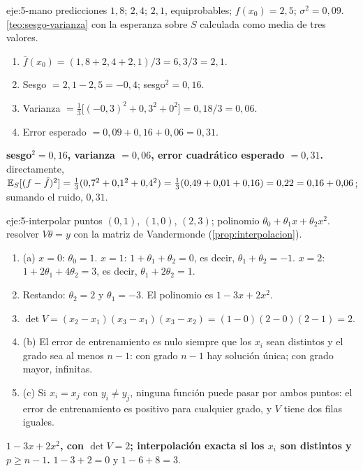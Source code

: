 \begin{solucion}{eje:5-mano}
\datos predicciones $1{,}8$; $2{,}4$; $2{,}1$, equiprobables; $f(x_0)=2{,}5$; $\sigma^{2}=0{,}09$.
\planteamiento \cref{teo:sesgo-varianza} con la esperanza sobre $S$ calculada como media de tres valores.
\pasos
\begin{enumerate}[label=\arabic*.]
  \item $\bar f(x_0)=(1{,}8+2{,}4+2{,}1)/3=6{,}3/3=2{,}1$.
  \item Sesgo $=2{,}1-2{,}5=-0{,}4$; sesgo$^{2}=0{,}16$.
  \item Varianza $=\frac13\bigl[(-0{,}3)^{2}+0{,}3^{2}+0^{2}\bigr]=0{,}18/3=0{,}06$.
  \item Error esperado $=0{,}09+0{,}16+0{,}06=0{,}31$.
\end{enumerate}
\resultado \textbf{sesgo$^{2}=0{,}16$, varianza $=0{,}06$, error cuadrático esperado $=0{,}31$.}
\comprobacion directamente, $\mathbb{E}_S[(f-\hat f)^{2}]=\frac13(0{,}7^{2}+0{,}1^{2}+0{,}4^{2})=\frac13(0{,}49+0{,}01+0{,}16)=0{,}22=0{,}16+0{,}06$; sumando el ruido, $0{,}31$.
\end{solucion}

\begin{solucion}{eje:5-interpolar}
\datos puntos $(0,1)$, $(1,0)$, $(2,3)$; polinomio $\theta_0+\theta_1x+\theta_2x^{2}$.
\planteamiento resolver $V\theta=y$ con la matriz de Vandermonde (\cref{prop:interpolacion}).
\pasos
\begin{enumerate}[label=\arabic*.]
  \item (a) $x=0$: $\theta_0=1$. $x=1$: $1+\theta_1+\theta_2=0$, es decir, $\theta_1+\theta_2=-1$. $x=2$: $1+2\theta_1+4\theta_2=3$, es decir, $\theta_1+2\theta_2=1$.
  \item Restando: $\theta_2=2$ y $\theta_1=-3$. El polinomio es $1-3x+2x^{2}$.
  \item $\det V=(x_2-x_1)(x_3-x_1)(x_3-x_2)=(1-0)(2-0)(2-1)=2$.
  \item (b) El error de entrenamiento es nulo siempre que los $x_i$ sean distintos y el grado sea al menos $n-1$: con grado $n-1$ hay solución única; con grado mayor, infinitas.
  \item (c) Si $x_i=x_j$ con $y_i\ne y_j$, ninguna función puede pasar por ambos puntos: el error de entrenamiento es positivo para cualquier grado, y $V$ tiene dos filas iguales.
\end{enumerate}
\resultado \textbf{$1-3x+2x^{2}$, con $\det V=2$; interpolación exacta si los $x_i$ son distintos y $p\ge n-1$.}
\comprobacion $1-3+2=0$ y $1-6+8=3$.
\end{solucion}

